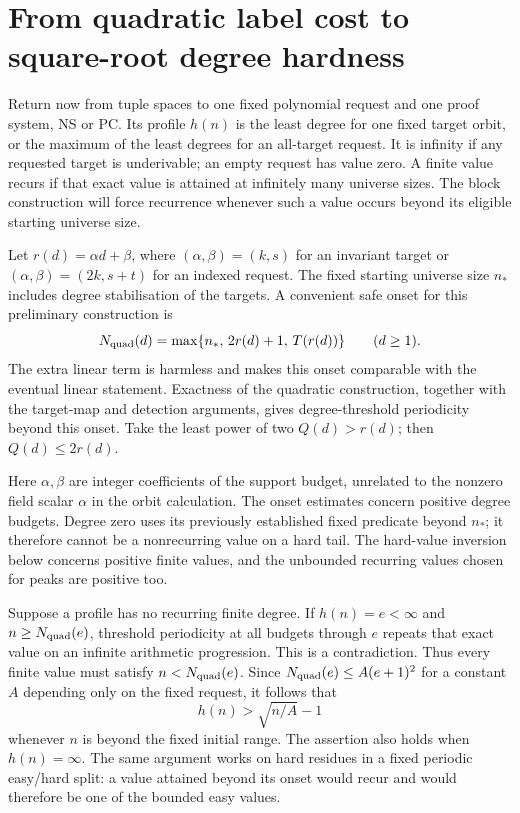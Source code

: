 \section{From quadratic label cost to square-root degree hardness}
Return now from tuple spaces to one fixed polynomial request and one
proof system, NS or PC. Its profile $h(n)$ is the least degree for
one fixed target orbit, or the maximum of the least degrees for an
all-target request. It is infinity if any requested target is
underivable; an empty request has value zero. A finite value recurs if that exact value is
attained at infinitely many universe sizes. The block construction
will force recurrence whenever such a value occurs beyond its
eligible starting universe size.

Let $r(d)=\alpha d+\beta$, where
$(\alpha,\beta)=(k,s)$ for an invariant target or
$(\alpha,\beta)=(2k,s+t)$ for an indexed request. The fixed starting
universe size $n_*$ includes degree stabilisation of the targets. A convenient
safe onset for this preliminary construction is
\[
 N_{\rm quad}(d)=
  \max\{n_*,\,2r(d)+1,\,T(r(d))\}\qquad(d\ge1).
\]
The extra linear term is harmless and makes this onset comparable
with the eventual linear statement. Exactness of the quadratic
construction, together with the target-map and detection arguments,
gives degree-threshold periodicity beyond this onset. Take the least
power of two $Q(d)>r(d)$; then $Q(d)\le2r(d)$.

Here $\alpha,\beta$ are integer coefficients of the support budget,
unrelated to the nonzero field scalar $\alpha$ in the orbit
calculation. The onset estimates concern positive degree budgets.
Degree zero uses its previously established fixed predicate beyond
$n_*$; it therefore cannot be a nonrecurring value on a hard tail.
The hard-value inversion below concerns positive finite values,
and the unbounded recurring values chosen for peaks are positive too.

Suppose a profile has no recurring finite degree. If $h(n)=e<\infty$
and $n\ge N_{\rm quad}(e)$, threshold periodicity at all budgets
through $e$ repeats that exact value on an infinite arithmetic
progression. This is a contradiction. Thus every finite value must
satisfy $n<N_{\rm quad}(e)$. Since
$N_{\rm quad}(e)\le A(e+1)^2$ for a constant $A$ depending only
on the fixed request, it follows that
\[
                          h(n)>\sqrt{n/A}-1
\]
whenever $n$ is beyond the fixed initial range. The assertion also
holds when $h(n)=\infty$. The same argument works on hard residues
in a fixed periodic easy/hard split: a value attained beyond its
onset would recur and would therefore be one of the bounded easy
values.

